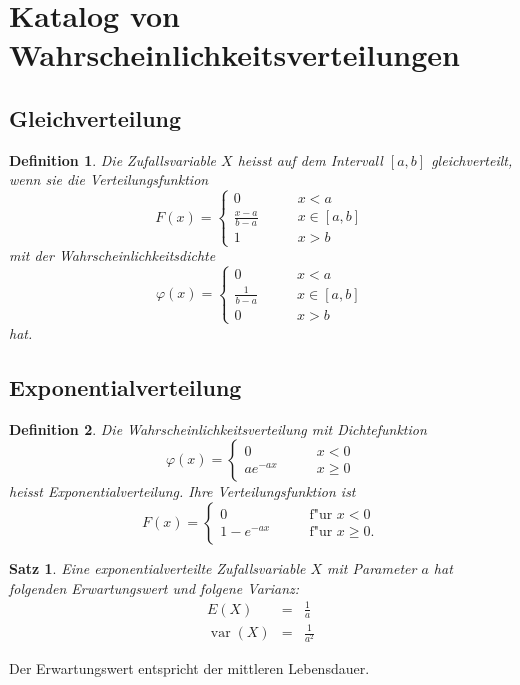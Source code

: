 \documentclass[ngerman, a4paper, 10pt, twocolumn, DIV20, headings=small]{scrartcl}
\newtheorem{definition}{Definition}
\newtheorem{satz}{Satz}
\begin{document}
\section{Katalog von Wahrscheinlichkeitsverteilungen}

\subsection{Gleichverteilung}

\begin{definition}Die Zufallsvariable $X$ heisst auf dem Intervall
$[a,b]$ gleichverteilt, wenn sie die Verteilungsfunktion
\[
F(x)=\begin{cases}
0&\qquad x< a\\
\frac{x-a}{b-a}&\qquad x\in[a,b]\\
1&\qquad x> b
\end{cases}
\]
mit der Wahrscheinlichkeitsdichte
\[
\varphi(x)=\begin{cases}
0&\qquad x< a\\
\frac1{b-a}&\qquad x\in[a,b]\\
0&\qquad x> b
\end{cases}
\]
hat.
\end{definition}

\subsection{Exponentialverteilung}
\begin{definition}
Die Wahrscheinlichkeitsverteilung mit Dichtefunktion
\[
\varphi(x)=\begin{cases}
0&\qquad x<0\\
a e^{-a x}&\qquad x\ge 0
\end{cases}
\]
heisst Exponentialverteilung. Ihre Verteilungsfunktion ist
\[
F(x)=\begin{cases}
0&\qquad\text{f"ur $x < 0$}\\
1-e^{-ax}&\qquad\text{f"ur $x\ge 0$}.
\end{cases}
\]
\end{definition}

\begin{satz}Eine exponentialverteilte Zufallsvariable $X$ mit Parameter
$a$ hat folgenden Erwartungswert und folgene Varianz:
\begin{eqnarray*}
E(X)&=&\frac1a\\
\operatorname{var}(X)&=&\frac1{a^2}
\end{eqnarray*}
\end{satz}
Der Erwartungswert entspricht der mittleren Lebensdauer.
\end{document}
